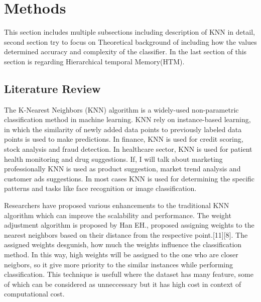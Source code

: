 \documentclass[conference]{IEEEtran}
\begin{document}
\section{Methods}

This section includes multiple subsections including description of KNN in detail, second section try to focus on Theoretical background of including how the values determined accuracy and complexity  of the classifier. In the last section of this section is regarding Hierarchical temporal Memory(HTM). 



\subsection{Literature Review}
The K-Nearest Neighbors (KNN) algorithm is a widely-used non-parametric classification method in machine learning. KNN rely on instance-based learning, in which the similarity of newly added data points to previously labeled data points is used to make predictions. In finance, KNN is used for credit scoring, stock analysis and fraud detection. In healthcare sector, KNN is used for patient health monitoring and drug suggestions. If, I will talk about marketing professionally KNN is used as product suggestion, market trend analysis and customer ads suggestions. In most cases KNN is used for determining the specific patterns and tasks like face recognition or image classification. 

Researchers have proposed various enhancements to the traditional KNN algorithm which can improve the scalability and performance. The weight adjustment algorithm is proposed by Han EH., proposed assigning weights to the nearest neighbors based on their distance from the respective point.[11][8]. The assigned weights desgunish, how much the weights influence the classification method. In this way, high weights will be assigned to the one who are closer neigbors, so it give more priority to the similar instances while performing classification.  This technique is usefull where the dataset has many feature, some of which can be considered as unneccessary but it has high cost in context of computational cost.
\end{document}
